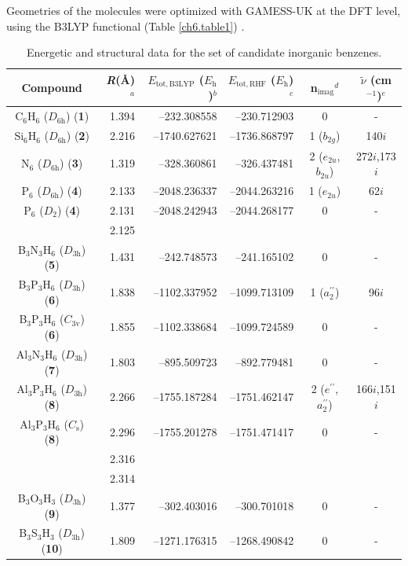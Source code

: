 Geometries of the molecules were optimized with GAMESS-UK  \cite{gamess} at the
DFT level, using the B3LYP functional (Table \ref{ch6.table1}) \cite{b3lyp1,b3lyp2,b3lyp3}.
\begin{table}[htdp]
\caption{Energetic and structural data for the set of candidate inorganic benzenes.}
\begin{center}
\begin{tabular}{c r r r c c}
\hline
\textbf{Compound}&
\textit{R}(\AA)${}^{a}$& 
$E_{\mathrm{tot,B3LYP}}$ ($E_{\mathrm{h}}$)${ }^{b}$&
$E_{\mathrm{tot,RHF}}$ ($E_{\mathrm{h}}$)${ }^{c}$ &
\mbox{n$_{\mathrm{imag}}$}${}^{d}$ &
$\tilde{\nu}$ (cm$^{-1}$)${}^{e}$\\
\hline
C$_6$H$_6$ ($D_\mathrm{6h}$) (\textbf{1})&1.394&--232.308558& --230.712903&0&-\\
Si$_6$H$_6$ ($D_\mathrm{6h}$) (\textbf{2})&2.216&--1740.627621&--1736.868797&1 ($b_{2g}$)&140$i$\\
N$_6$ ($D_\mathrm{6h}$) (\textbf{3})&1.319&--328.360861& --326.437481&2 ($e_{2u}$, $b_{2u}$)&272$i$,173$i$\\
P$_6$ ($D_\mathrm{6h}$) (\textbf{4})&2.133&--2048.236337&--2044.263216&1 ($e_{2u}$)&62$i$\\
P$_6$ ($D_\mathrm{2}$) (\textbf{4})&2.131&--2048.242943&--2044.268177&0&-\\
&2.125&&&&\\
B$_3$N$_3$H$_6$ ($D_\mathrm{3h}$) (\textbf{5})&1.431&--242.748573& --241.165102&0&-\\
B$_3$P$_3$H$_6$ ($D_\mathrm{3h}$) (\textbf{6})&1.838&--1102.337952&--1099.713109&1 ($a_2^{\prime\prime}$)&96$i$\\
B$_3$P$_3$H$_6$ ($C_\mathrm{3v}$) (\textbf{6})&1.855&--1102.338684&--1099.724589&0&-\\
Al$_3$N$_3$H$_6$ ($D_\mathrm{3h}$) (\textbf{7})&1.803&--895.509723& --892.779481&0&-\\
Al$_3$P$_3$H$_6$ ($D_\mathrm{3h}$) (\textbf{8})&2.266&--1755.187284&--1751.462147&2 ($e^{\prime\prime}$, $a_2^{\prime\prime}$)&166$i$,151$i$\\
Al$_3$P$_3$H$_6$ ($C_\mathrm{s}$) (\textbf{8})&2.296&--1755.201278&--1751.471417&0&-\\
&2.316&&&&\\
&2.314&&&&\\
B$_3$O$_3$H$_3$ ($D_\mathrm{3h}$) (\textbf{9})&1.377&--302.403016& --300.701018&0&-\\
B$_3$S$_3$H$_3$ ($D_\mathrm{3h}$) (\textbf{10})&1.809&--1271.176315&--1268.490842&0&-\\

\end{tabular}
\end{center}
\end{table}
